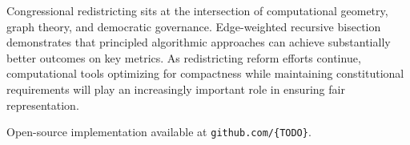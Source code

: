 \documentclass[11pt,twocolumn]{article}
\begin{document}
Congressional redistricting sits at the intersection of computational geometry, graph theory, and democratic governance. Edge-weighted recursive bisection demonstrates that principled algorithmic approaches can achieve substantially better outcomes on key metrics. As redistricting reform efforts continue, computational tools optimizing for compactness while maintaining constitutional requirements will play an increasingly important role in ensuring fair representation.

Open-source implementation available at \texttt{github.com/\{TODO\}}.



\end{document}
